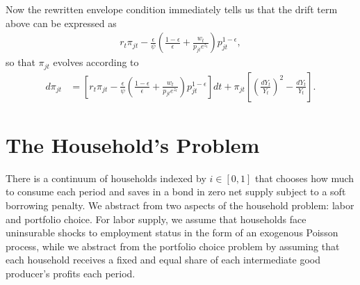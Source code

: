 \documentclass[notitlepage,a4paper,11pt]{report}
\numberwithin{section}{chapter}
\numberwithin{subsection}{section}
\begin{document}
Now the rewritten envelope condition immediately tells us that the drift term above can be expressed as 
\begin{align*}
r_t  \pi_{jt} - \frac{\epsilon}{ \psi} \left( \frac{ 1-\epsilon}{\epsilon}  +  \frac{w_t}{ p_{jt} e^{z_t} } \right) p_{jt}^{1-\epsilon}, 
\end{align*} 
so that $\pi_{jt}$ evolves according to
\begin{align*}
d\pi_{jt} & = \left[ r_t  \pi_{jt} - \frac{\epsilon}{ \psi} \left( \frac{ 1-\epsilon}{\epsilon}  +  \frac{w_t}{ p_{jt} e^{z_t} } \right) p_{jt}^{1-\epsilon} \right] dt  +\pi_{jt} \left[  \left( \frac{dY_t}{Y_t} \right)^2 - \frac{dY_t}{Y_t}  \right].  
\end{align*}



\pagebreak




\section{The Household's Problem} 

There is a continuum of households indexed by $i \in [0,1]$ that chooses how much to consume each period and saves in a bond in zero net supply subject to a soft borrowing penalty. We abstract from two aspects of the household problem: labor and portfolio choice. For labor supply, we assume that households face uninsurable shocks to employment status in the form of an exogenous Poisson process, while we abstract from the portfolio choice problem by assuming that each household receives a fixed and equal share of each intermediate good producer's profits each period. 
\end{document}
